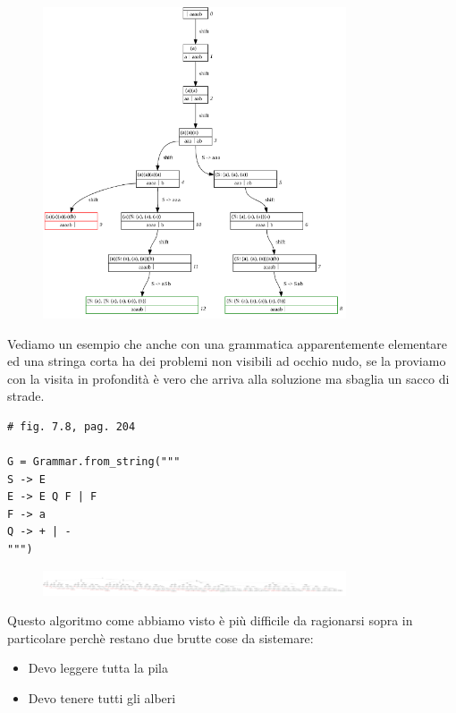 \begin{figure}[ht!]
  \centering
  \includegraphics[width=0.8\textwidth]{images/Parsing/bottom_up_depth.png}
\end{figure}



Vediamo un esempio che anche con una grammatica apparentemente elementare ed una stringa corta ha dei problemi non visibili ad occhio nudo, se la proviamo con la visita in profondità è vero che arriva alla soluzione ma sbaglia un sacco di strade.

\begin{lstlisting}
# fig. 7.8, pag. 204

G = Grammar.from_string("""
S -> E
E -> E Q F | F
F -> a
Q -> + | -
""")
\end{lstlisting}

\begin{figure}[ht!]
  \centering
  \includegraphics[width=0.8\textwidth]{images/Parsing/bottom_up_realistico.png}
\end{figure}

Questo algoritmo come abbiamo visto è più difficile da ragionarsi sopra in particolare perchè restano due brutte cose da sistemare:
\begin{itemize}
  \item Devo leggere tutta la pila
  \item Devo tenere tutti gli alberi
\end{itemize}

